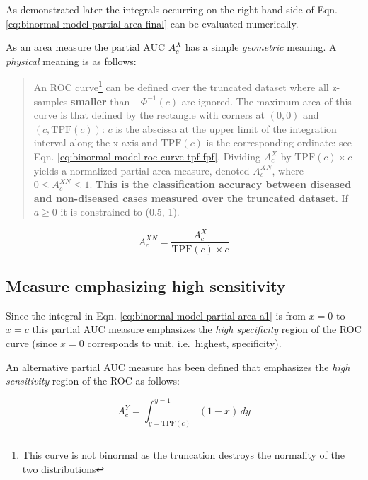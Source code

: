 \documentclass[
]{book}
\begin{document}
As demonstrated later the integrals occurring on the right hand side of Eqn. \eqref{eq:binormal-model-partial-area-final} can be evaluated numerically.

As an area measure the partial AUC \(A_c^{X}\) has a simple \emph{geometric} meaning. A \emph{physical} meaning is as follows:

\begin{quote}
An ROC curve\footnote{This curve is not binormal as the truncation destroys the normality of the two distributions} can be defined over the truncated dataset where all z-samples \textbf{smaller} than \(-\Phi^{-1}(c)\) are ignored. The maximum area of this curve is that defined by the rectangle with corners at \((0,0)\) and \((c,\text{TPF}\left ( c \right ))\): \(c\) is the abscissa at the upper limit of the integration interval along the x-axis and \(\text{TPF}\left ( c \right )\) is the corresponding ordinate: see Eqn. \eqref{eq:binormal-model-roc-curve-tpf-fpf}. Dividing \(A_c^{X}\) by \(\text{TPF}\left ( c \right ) \times c\) yields a normalized partial area measure, denoted \(A_c^{XN}\), where \(0 \le A_c^{XN} \le 1\). \textbf{This is the classification accuracy between diseased and non-diseased cases measured over the truncated dataset.} If \(a \ge 0\) it is constrained to (0.5, 1).
\end{quote}

\begin{equation}
A_c^{XN} = \frac{A_c^{X}}{\text{TPF}\left ( c \right ) \times c}
\label{eq:binormal-model-normalized-partial-auc-specificity}
\end{equation}

\hypertarget{binormal-model-metz-partial-auc}{%
\subsection{Measure emphasizing high sensitivity}\label{binormal-model-metz-partial-auc}}

Since the integral in Eqn. \eqref{eq:binormal-model-partial-area-a1} is from \(x = 0\) to \(x = c\) this partial AUC measure emphasizes the \emph{high specificity} region of the ROC curve (since \(x = 0\) corresponds to unit, i.e.~highest, specificity).

An alternative partial AUC measure has been defined \citep{jiang1996receiver} that emphasizes the \emph{high sensitivity} region of the ROC as follows:

\begin{equation} 
A_c^{Y} = \int_{y=\text{TPF}(c)}^{y=1} \left (1-x  \right ) \, dy
\label{eq:binormal-model-partial-area-ac-metz}
\end{equation}
\end{document}

